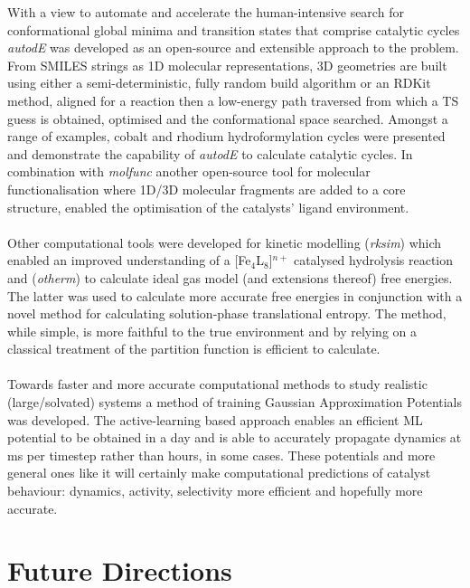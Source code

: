 \documentclass[../main.tex]{subfiles}
\begin{document}
With a view to automate and accelerate the human-intensive search for conformational global minima and transition states that comprise catalytic cycles \emph{autodE} was developed as an open-source and extensible approach to the problem. From SMILES strings as 1D molecular representations, 3D geometries are built using either a semi-deterministic, fully random build algorithm or an RDKit\cite{Landrum2019} method, aligned for a reaction then a low-energy path traversed from which a TS guess is obtained, optimised and the conformational space searched. Amongst a range of examples, cobalt and rhodium hydroformylation cycles were presented and demonstrate the capability of \emph{autodE} to calculate catalytic cycles. In combination with \emph{molfunc} another open-source tool for molecular functionalisation where 1D/3D molecular fragments are added to a core structure, enabled the optimisation of the catalysts' ligand environment. 
\\\\
Other computational tools were developed for kinetic modelling (\emph{rksim}) which enabled an improved understanding of a [Fe${}_4$L${}_8$]${}^{n+}$ catalysed hydrolysis reaction and (\emph{otherm}) to calculate ideal gas model (and extensions thereof) free energies. The latter was used to calculate more accurate free energies in conjunction with a novel method for calculating solution-phase translational entropy. The method, while simple, is more faithful to the true environment and by relying on a classical treatment of the partition function is efficient to calculate.
\\\\
Towards faster and more accurate computational methods to study realistic (large/solvated) systems a method of training Gaussian Approximation Potentials was developed. The active-learning based approach enables an efficient ML potential to be obtained in a day and is able to accurately propagate dynamics at ms per timestep rather than hours, in some cases. These potentials and more general ones like it will certainly make computational predictions of catalyst behaviour: dynamics, activity, selectivity more efficient and hopefully more accurate.



\section{Future Directions}
\end{document}
